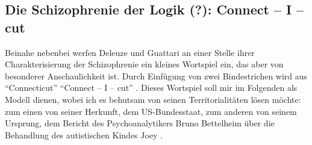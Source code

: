 \documentclass[12pt,
               DIV13,
               paper=a4,
               twoside=false,
               onehalfspacing,
               bibliography=totoc,
               toc=graduated,
               draft,
               ]{scrartcl}
\newcommand{\pc}[2]{\parencite[#1]{#2}}
\newcommand{\worries}[1]{\ifdraft{\textcolor{blue}{\texttt{(#1)}}}{}}
\newcommand{\gwg}{G--W--G'\xspace}
\newcommand{\cic}{Connect -- I -- cut\xspace}
\newcommand{\dg}{Deleuze und Guattari\xspace}
\begin{document}












\subsection{Die Schizophrenie der Logik (?): \cic}

%

Beinahe nebenbei werfen \dg an einer Stelle ihrer Charakterisierung
der Schizophrenie ein kleines Wortspiel ein, das aber von
besonderer Anschaulichkeit ist. Durch Einfügung von zwei Bindestrichen
wird aus "`Connecticut"' "`\cic"' \pc{48}{ao}. Dieses Wortspiel soll
mir im Folgenden als Modell dienen, wobei ich es behutsam von seinen
Territorialitäten lösen möchte: zum einen von seiner Herkunft, dem
US-Bundesstaat, zum anderen von seinem Ursprung, dem Bericht des
Psychoanalytikers Bruno Bettelheim über die Behandlung des
autistischen Kindes Joey \parencites[vgl.][]{joey}[306-446]{emptyf}.
\end{document}
